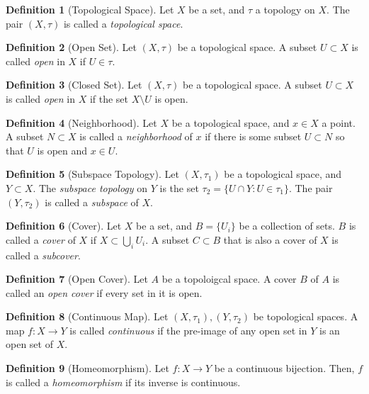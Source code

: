 \documentclass{article}
\theoremstyle{definition}
\newtheorem{definition}{Definition}[subsection]
\begin{document}
    \begin{definition}[Topological Space]
        Let $X$ be a set, and $\tau$ a topology on $X$. The pair $(X,\tau)$ is called a \textit{topological space}.        
    \end{definition}
    \begin{definition}[Open Set]
        Let $(X,\tau)$ be a topological space. A subset $U\subset X$ is called \textit{open} in $X$ if $U\in \tau$.
    \end{definition}
    \begin{definition}[Closed Set]
        Let $(X,\tau)$ be a topological space. A subset $U\subset X$ is called \textit{open} in $X$ if the set $X \setminus U$ is  open.
    \end{definition}
    \begin{definition}[Neighborhood]
        Let $X$ be a topological space, and $x\in X$ a point. A subset $N\subset X$ is called a \textit{neighborhood} of $x$ if there is some subset $U\subset N$ so that $U$ is open and $x\in U$.
    \end{definition}
    \begin{definition}[Subspace Topology]
        Let $(X,\tau_1)$ be a topological space, and $Y\subset X$. The \textit{subspace topology} on $Y$ is the set $\tau_2=\{U\cap Y : U \in \tau_1\}$. The pair $(Y,\tau_2)$ is called a \textit{subspace} of $X$.
    \end{definition}
    \begin{definition}[Cover]
        Let $X$ be a set, and $B=\{U_i\}$ be a collection of sets. $B$ is called a \textit{cover} of $X$ if $X\subset \bigcup \limits_{i}U_i$. A subset $C\subset B$ that is also a cover of $X$ is called a \textit{subcover}.
    \end{definition}
    \begin{definition}[Open Cover]
        Let $A$ be a topoloigcal space. A cover $B$ of $A$ is called an \textit{open cover} if every set in it is open.
    \end{definition}
    \begin{definition}[Continuous Map]
        Let $(X,\tau_1),(Y,\tau_2)$ be topological spaces. A map $f:X\rightarrow Y$ is called \textit{continuous} if the pre-image of any open set in $Y$ is an open set of $X$.
    \end{definition}
    \begin{definition}[Homeomorphism]
        Let $f:X\rightarrow Y$ be a continuous bijection. Then, $f$ is called a \textit{homeomorphism} if its inverse is continuous. 
    \end{definition}
\end{document}
